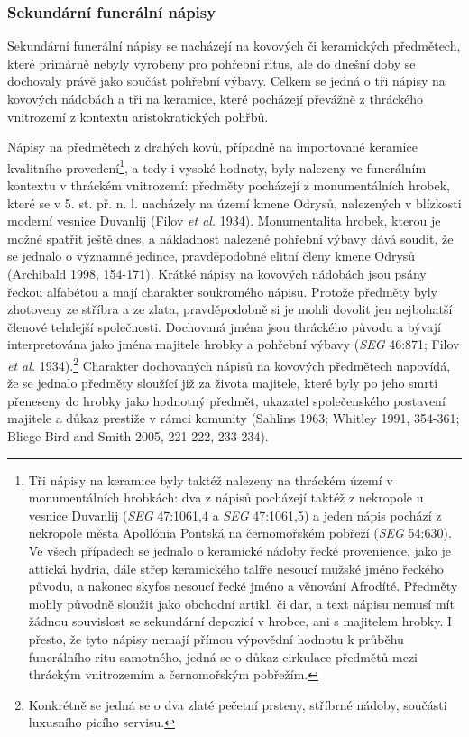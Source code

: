 \subsubsection[sekundární-funerální-nápisy]{Sekundární funerální nápisy}

Sekundární funerální nápisy se nacházejí na kovových či keramických předmětech, které primárně nebyly vyrobeny pro pohřební ritus, ale do dnešní doby se dochovaly právě jako součást pohřební výbavy. Celkem se jedná o tři nápisy na kovových nádobách a tři na keramice, které pocházejí převážně z thráckého vnitrozemí z kontextu aristokratických pohřbů.

Nápisy na předmětech z drahých kovů, případně na importované keramice kvalitního provedení\footnote{Tři nápisy na keramice byly taktéž nalezeny na thráckém území v monumentálních hrobkách: dva z nápisů pocházejí taktéž z nekropole u vesnice Duvanlij ({\em SEG} 47:1061,4 a {\em SEG} 47:1061,5) a jeden nápis pochází z nekropole města Apollónia Pontská na černomořském pobřeží ({\em SEG} 54:630). Ve všech případech se jednalo o keramické nádoby řecké provenience, jako je attická hydria, dále střep keramického talíře nesoucí mužské jméno řeckého původu, a nakonec skyfos nesoucí řecké jméno a věnování Afrodíté. Předměty mohly původně sloužit jako obchodní artikl, či dar, a text nápisu nemusí mít žádnou souvislost se sekundární depozicí v hrobce, ani s majitelem hrobky. I přesto, že tyto nápisy nemají přímou výpovědní hodnotu k průběhu funerálního ritu samotného, jedná se o důkaz cirkulace předmětů mezi thráckým vnitrozemím a černomořským pobřežím.}, a tedy i vysoké hodnoty, byly nalezeny ve funerálním kontextu v thráckém vnitrozemí: předměty pocházejí z monumentálních hrobek, které se v 5. st. př. n. l. nacházely na území kmene Odrysů, nalezených v blízkosti moderní vesnice Duvanlij (Filov {\em et al.} 1934). Monumentalita hrobek, kterou je možné spatřit ještě dnes, a nákladnost nalezené pohřební výbavy dává soudit, že se jednalo o významné jedince, pravděpodobně elitní členy kmene Odrysů (Archibald 1998, 154-171). Krátké nápisy na kovových nádobách jsou psány řeckou alfabétou a mají charakter soukromého nápisu. Protože předměty byly zhotoveny ze stříbra a ze zlata, pravděpodobně si je mohli dovolit jen nejbohatší členové tehdejší společnosti. Dochovaná jména jsou thráckého původu a bývají interpretována jako jména majitele hrobky a pohřební výbavy ({\em SEG} 46:871; Filov {\em et al.} 1934).\footnote{Konkrétně se jedná se o dva zlaté pečetní prsteny, stříbrné nádoby, součásti luxusního picího servisu.} Charakter dochovaných nápisů na kovových předmětech napovídá, že se jednalo předměty sloužící již za života majitele, které byly po jeho smrti přeneseny do hrobky jako hodnotný předmět, ukazatel společenského postavení majitele a důkaz prestiže v rámci komunity (Sahlins 1963; Whitley 1991, 354-361; Bliege Bird and Smith 2005, 221-222, 233-234).

